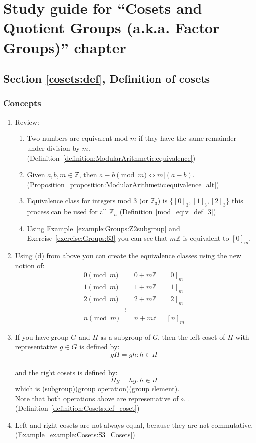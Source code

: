 \section{Study guide  for ``Cosets and Quotient Groups (a.k.a. Factor Groups)''  chapter}
\label{sec:Cosets:study} 


\subsection*{Section \ref{cosets:def}, Definition of cosets}
\subsubsection*{Concepts}
\begin{enumerate}
\item 
Review:
	\begin{enumerate}
	\item
	Two numbers are equivalent mod $m$ if they have the same remainder under division by $m$. (Definition~\ref{definition:ModularArithmetic:equivalence})
	\item
	Given $a, b, m \in {\mathbb Z}$, then $a \equiv b \pmod{m} \iff m | (a - b)$. (Proposition~\ref{proposition:ModularArithmetic:equivalence_alt})
	\item
	Equivalence class for integers mod 3 (or ${\mathbb Z}_3$) is $\{ [0]_3, [1]_3, [2]_3 \}$ this process can be used for all ${\mathbb Z}_n$ (Definition~\ref{mod_eqiv_def_3})
	\item
	Using Example~\ref{example:Groups:Z2subgroup} and Exercise~\ref{exercise:Groups:63} you can see that $m{\mathbb Z}$ is equivalent to  $[0]_m$.
	\end{enumerate}
	
\item
Using (d) from above you can create the equivalence classes using the new notion of:
	\begin{align*}
	0 \pmod{m} &= 0 + m{\mathbb Z} = [0]_m
	\\
	1 \pmod{m} &= 1 + m{\mathbb Z} = [1]_m
	\\
	2 \pmod{m} &= 2 + m{\mathbb Z} =  [2]_m
	\\
	&\vdots
	\\
	n \pmod{m} &= n + m{\mathbb Z} =  [n]_m
	\end{align*}

\item
If you have group $G$ and $H$ as a subgroup of $G$, then the left coset of $H$ with representative $g \in G$ is defined by:
\\
$$gH = {gh:h \in H}$$
\\
and the right cosets is defined by:
\\
$$Hg = {hg:h \in H}$$
which is (subgroup)(group operation)(group element).
\\
Note that both operations above are representative of $\circ$. . (Definition~\ref{definition:Cosets:def_coset})

\item
Left and right cosets are not always equal, because they are not commutative. (Example~\ref{example:Cosets:S3_Cosets})
\end{enumerate}

